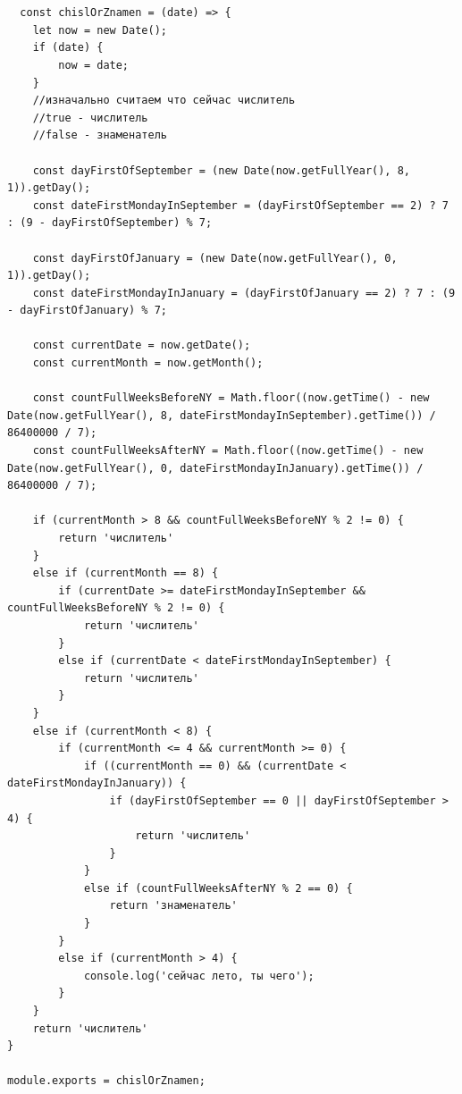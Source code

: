 \documentclass[bachelor, och, coursework, times]{SCWorks}
\begin{document}

\section {\appendixname}

\begin{lstlisting}
  const chislOrZnamen = (date) => {
    let now = new Date();
    if (date) {
        now = date;
    }
    //изначально считаем что сейчас числитель
    //true - числитель
    //false - знаменатель
    
    const dayFirstOfSeptember = (new Date(now.getFullYear(), 8, 1)).getDay();
    const dateFirstMondayInSeptember = (dayFirstOfSeptember == 2) ? 7 : (9 - dayFirstOfSeptember) % 7;
    
    const dayFirstOfJanuary = (new Date(now.getFullYear(), 0, 1)).getDay();
    const dateFirstMondayInJanuary = (dayFirstOfJanuary == 2) ? 7 : (9 - dayFirstOfJanuary) % 7;
    
    const currentDate = now.getDate();
    const currentMonth = now.getMonth();
    
    const countFullWeeksBeforeNY = Math.floor((now.getTime() - new Date(now.getFullYear(), 8, dateFirstMondayInSeptember).getTime()) / 86400000 / 7);
    const countFullWeeksAfterNY = Math.floor((now.getTime() - new Date(now.getFullYear(), 0, dateFirstMondayInJanuary).getTime()) / 86400000 / 7);
    
    if (currentMonth > 8 && countFullWeeksBeforeNY % 2 != 0) {
        return 'числитель'
    }
    else if (currentMonth == 8) {
        if (currentDate >= dateFirstMondayInSeptember && countFullWeeksBeforeNY % 2 != 0) {
            return 'числитель'
        }
        else if (currentDate < dateFirstMondayInSeptember) {
            return 'числитель'
        }
    }
    else if (currentMonth < 8) {
        if (currentMonth <= 4 && currentMonth >= 0) {
            if ((currentMonth == 0) && (currentDate < dateFirstMondayInJanuary)) {
                if (dayFirstOfSeptember == 0 || dayFirstOfSeptember > 4) {
                    return 'числитель'
                }
            }
            else if (countFullWeeksAfterNY % 2 == 0) {
                return 'знаменатель'
            }
        }
        else if (currentMonth > 4) {
            console.log('сейчас лето, ты чего');
        }
    }
    return 'числитель'
}

module.exports = chislOrZnamen;
\end{lstlisting}
\end{document}
